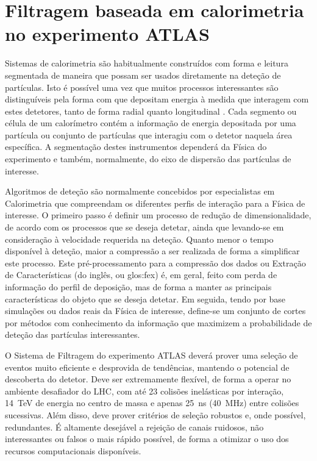 \typeout{ ====================================================================}
\typeout{ ====================================================================}

\chapter{Filtragem baseada em calorimetria no experimento ATLAS}
\label{chap:baseline}

Sistemas de calorimetria são habitualmente construídos com forma e leitura
segmentada de maneira que possam ser usados diretamente na dete\-ção de
par\-tí\-culas. Isto é possível uma vez que muitos processos interessantes são
distinguíveis pela forma com que depositam energia à medida que interagem com
estes detetores, tanto de forma radial quanto longitudinal
\cite{wigmans-book}. Cada segmento ou célula de um calorímetro contém a
informação de energia depositada por uma par\-tí\-cula ou conjunto de
par\-tí\-culas que interagiu com o detetor naquela área espe\-cí\-fica. A
seg\-men\-ta\-ção destes instrumentos dependerá da Física do experimento e
também, normalmente, do eixo de dispersão das partículas de interesse.

Algoritmos de dete\-ção são normalmente concebidos por especialistas em
Calorimetria que compreendam os diferentes perfis de intera\-ção para a
Fí\-sica de interesse. O primeiro passo é definir um processo de redu\-ção de
dimensionalidade, de acordo com os processos que se deseja detetar, ainda que
levando-se em consideração à velocidade requerida na deteção. Quanto menor o
tempo disponível à deteção, maior a compressão a ser realizada de forma a
simplificar este processo. Este pré-processamento para a compressão dos dados
ou Extração de Características (do inglês,  ou
\gls{glos:fex}) é, em geral, feito com perda de informação do perfil de
deposição, mas de forma a manter as principais características do objeto que
se deseja detetar. Em seguida, tendo por base simulações ou dados reais da
Física de interesse, define-se um conjunto de cortes por métodos com
conhecimento da informação
 que maximizem a probabilidade de deteção das partículas
interessantes.

O Sistema de Filtragem  do experimento ATLAS deverá prover uma
seleção de eventos muito eficiente e desprovida de tendências, mantendo o
potencial de descoberta do detetor. Deve ser extremamente flexível, de forma a
operar no ambiente desafiador do LHC, com até 23 colisões inelásticas por
interação, 14~TeV de energia no centro de massa e apenas 25~ns (40~MHz) entre
colisões sucessivas. Além disso, deve prover critérios de seleção robustos e,
onde possível, redundantes. É altamente desejável a rejeição de canais
ruidosos, não interessantes ou falsos o mais rápido possível, de forma a
otimizar o uso dos recursos computacionais disponíveis.


